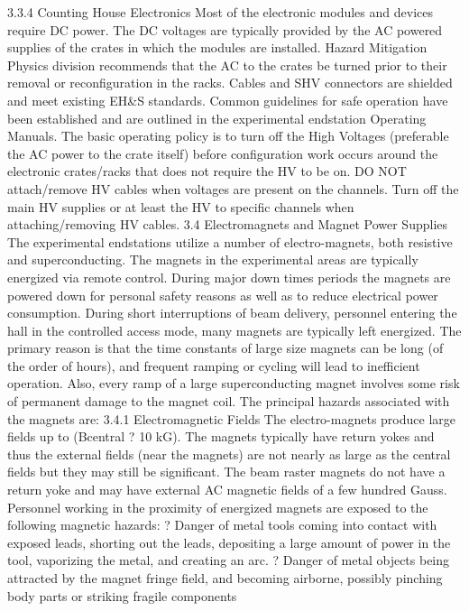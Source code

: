 {3.3.4 		Counting House Electronics
	Most of the electronic modules and devices require DC power. The DC voltages are typically provided by the AC powered supplies of the crates in which the modules are installed.
Hazard Mitigation
	Physics division recommends that the AC to the crates be turned prior to their removal or reconfiguration in the racks. Cables and SHV connectors are shielded and meet existing EH\&S standards. Common guidelines for safe operation have been established and are outlined in the experimental endstation Operating Manuals. The basic operating policy is to turn off the High Voltages (preferable the AC power to the crate itself) before configuration work occurs around the electronic crates/racks that does not require the HV to be on. DO NOT attach/remove HV cables when voltages are present on the channels. Turn off the main HV supplies or at least the HV to specific channels when attaching/removing HV cables.
3.4 		Electromagnets and Magnet Power Supplies
	The experimental endstations utilize a number of electro-magnets, both resistive and superconducting. The magnets in the experimental areas are typically energized via remote control. During major down times periods the magnets are powered down for personal safety reasons as well as to reduce electrical power consumption. During short interruptions of beam delivery, personnel entering the hall in the controlled access mode, many magnets are typically left energized. The primary reason is that the time constants of large size magnets can be long (of the order of hours), and frequent ramping or cycling will lead to inefficient operation. Also, every ramp of a large superconducting magnet involves some risk of permanent damage to the magnet coil. The principal hazards associated with the magnets are:
3.4.1		Electromagnetic Fields
	The electro-magnets produce large fields up to (Bcentral ? 10 kG). The magnets typically have return yokes and thus the external fields (near the magnets) are not nearly as large as the central fields but they may still be significant. The beam raster magnets do not have a return yoke and may have external AC magnetic fields of a few hundred Gauss. Personnel working in the proximity of energized magnets are exposed to the following magnetic hazards:
	? 	Danger of metal tools coming into contact with exposed leads, shorting out the
 			leads, depositing a large amount of power in the tool, vaporizing the metal, and
 			creating an arc.
	? 	Danger of metal objects being attracted by the magnet fringe field, and 
			becoming airborne, possibly pinching body parts or striking fragile components
}
